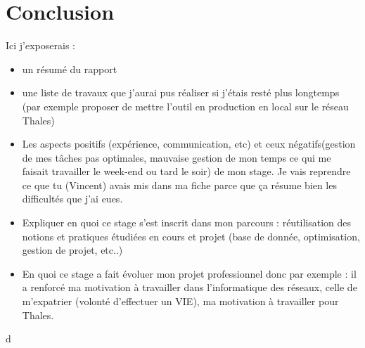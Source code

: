 \chapter*{Conclusion}



Ici j'exposerais :
\begin{itemize}
\item un résumé du rapport
\item une liste de travaux que j'aurai pus réaliser si j'étais resté plus longtemps (par exemple proposer de mettre l'outil en production en local sur le réseau Thales)
\item Les aspects positifs (expérience, communication, etc) et ceux négatifs(gestion de mes tâches pas optimales, mauvaise gestion de mon temps ce qui me faisait travailler le week-end ou tard le soir) de mon stage. Je vais reprendre ce que tu (Vincent) avais mis dans ma fiche parce que ça résume bien les difficultés que j'ai eues.
\item Expliquer en quoi ce stage s'est inscrit dans mon parcours : réutilisation des notions et pratiques étudiées en cours et projet (base de donnée, optimisation, gestion de projet, etc..)
\item En quoi ce stage a fait évoluer mon projet professionnel donc par exemple : il a renforcé ma motivation à travailler dans l'informatique des réseaux, celle de m'expatrier (volonté d'effectuer un VIE), ma motivation à travailler pour Thales.
\end{itemize}

\newpage
d